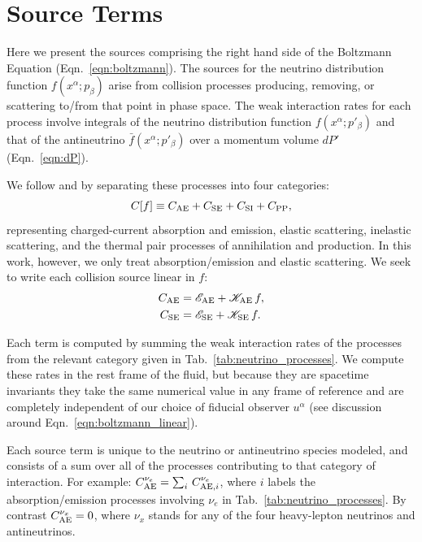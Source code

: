 \documentclass[aps,floatfix,prd,superscriptaddress,twocolumn]{revtex4-1}
\newcommand{\todo}[1]{\marginpar{\tiny{\textcolor{red}{#1}}}}
\begin{document}
\section{Source Terms}
\label{sec:source_terms}
Here we present the sources comprising the right hand side of the
Boltzmann Equation (Eqn.~\ref{eqn:boltzmann}). The sources for the neutrino
distribution function $f(x^\alpha;p_\beta)$ arise from collision processes
producing, removing, or scattering to/from that point in phase space.
The weak interaction rates for each process involve integrals of
the neutrino distribution function $f(x^\alpha;p'_\beta)$ and that of the
antineutrino $\bar{f}(x^\alpha;p'_\beta)$ over a momentum volume
$dP'$ (Eqn.~\ref{eqn:dP}).

We follow
\cite{brue1985-core_collapse} and \cite[Sec.~4]{shib2011-truncated_moment}
by separating these processes into four categories:
\begin{equation}
  \label{eqn:four_sources}
  C[f] \equiv C_{\rm AE} + C_{\rm SE} + C_{\rm SI} + C_{\rm PP},
\end{equation}
representing charged-current absorption and emission, elastic scattering,
inelastic scattering, and the thermal pair processes of annihilation and
production. In this work, however, we only treat absorption/emission
and elastic scattering.
We seek to write each collision source linear in $f$:
\begin{align}
  \label{eqn:sources_cae}
  C_{\rm AE}
  &= \mathscr{E}_{\rm AE} + \mathscr{K}_{\rm AE}\, f, \\
  \label{eqn:sources_cse}
  C_{\rm SE}
  &= \mathscr{E}_{\rm SE} + \mathscr{K}_{\rm SE}\, f.
\end{align}

Each term
is computed by summing the weak interaction rates of the processes from the
relevant category given in Tab.~\ref{tab:neutrino_processes}.
We compute these rates in the rest frame of the fluid,
but because they are spacetime invariants
they take the same numerical value in any frame of reference
and are completely independent of our choice of fiducial observer $u^\alpha$
(see discussion around Eqn.~\ref{eqn:boltzmann_linear}).

Each source term is unique to the neutrino or antineutrino species modeled,
and consists of a sum over all of the processes contributing to that
category of interaction. For example:
$C^{\nu_e}_{{\rm AE}} = \sum_i\,C^{\nu_e}_{{\rm AE},i}$,
where $i$ labels the absorption/emission processes involving $\nu_e$
in Tab.~\ref{tab:neutrino_processes}.
By contrast $C^{\nu_x}_{{\rm AE}} = 0$,
\todo{but we use a nonzero $C^{\nu_x}_{{\rm AE}}$}
where $\nu_x$ stands for any of the four heavy-lepton neutrinos and
antineutrinos.
\end{document}
